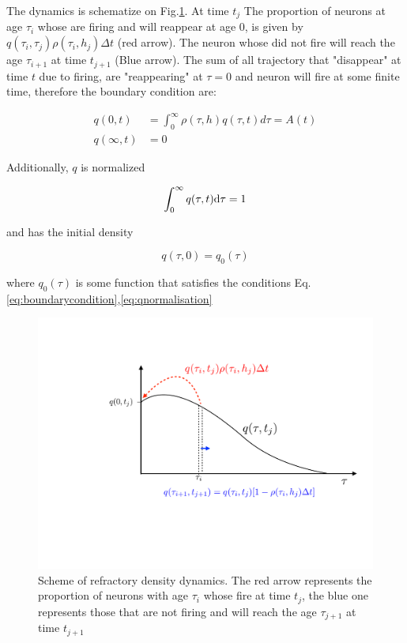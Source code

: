 \documentclass[a4paper,11pt,twoside]{article}
\def \dd  {{\rm d}}
\numberwithin{equation}{section}
\begin{document}
The dynamics is schematize on Fig.\ref{fig:qtau}. At time $t_j$ The proportion of neurons at age $\tau_i$ whose are firing and will reappear at age $0$, is given by$q(\tau_i,\tau_j)\rho(\tau_i,h_j)\Delta t$ (red arrow). The neuron whose did not fire will reach the age $\tau_{i+1}$ at time $t_{j+1}$ (Blue arrow). The sum of all trajectory that "disappear" at time $t$ due to firing, are "reappearing" at $\tau=0$ and  neuron will fire at some finite time, therefore the boundary condition are:

\begin{align}
\label{eq:boundarycondition}
q(0,t)&=\int_{0}^{\infty}\rho(\tau,h)q(\tau,t)d\tau=A(t) \\
q(\infty,t)&=0
\end{align}

Additionally, $q$ is normalized

\begin{equation}
\label{eq:qnormalisation}
\int_0^\infty q(\tau,t)\dd \tau = 1
\end{equation}

and has the initial density

\begin{equation}
\label{eq:qinitial}
q(\tau,0)=q_0(\tau)
\end{equation}

where $q_0(\tau)$ is some function that satisfies the conditions Eq.\eqref{eq:boundarycondition},\eqref{eq:qnormalisation}


\cite{Ger00,ChiGra07}


\begin{figure}
	\centering
	\includegraphics[width=0.7\linewidth]{qtau.pdf}
	\caption{Scheme of refractory density dynamics. The red arrow represents the proportion of neurons with age $\tau_i$ whose fire at time $t_j$, the blue one represents those that are not firing and will reach the age $\tau_{j+1}$ at time $t_{j+1}$
	}
	\label{fig:qtau}
\end{figure}
\end{document}
